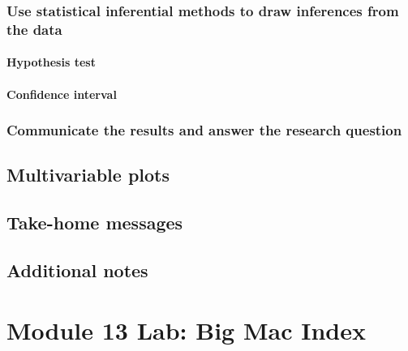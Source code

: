 \documentclass[
]{report}
\begin{document}
\subsubsection*{Use statistical inferential methods to draw inferences from the data}\label{use-statistical-inferential-methods-to-draw-inferences-from-the-data-9}

\paragraph*{Hypothesis test}\label{hypothesis-test-6}

\paragraph*{Confidence interval}\label{confidence-interval-8}

\subsubsection*{Communicate the results and answer the research question}\label{communicate-the-results-and-answer-the-research-question-5}

\subsection*{Multivariable plots}\label{multivariable-plots-1}

\subsection{Take-home messages}\label{take-home-messages-27}

\subsection{Additional notes}\label{additional-notes-28}

\section{Module 13 Lab: Big Mac Index}\label{module-13-lab-big-mac-index}
\end{document}
